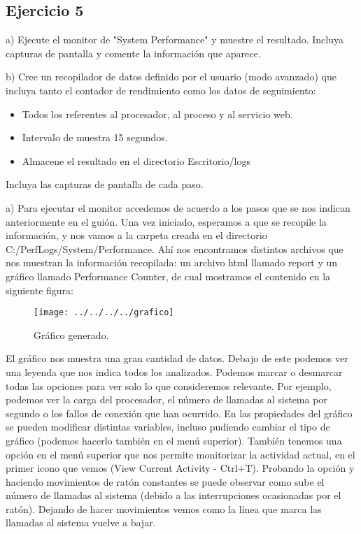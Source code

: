 \documentclass[a4paper, 11pt]{article} %
\begin{document}
\subsection{Ejercicio 5}
a) Ejecute el monitor de "System Performance" y muestre el resultado. Incluya capturas de pantalla y comente la información que aparece. 

b) Cree un recopilador de datos definido por el usuario (modo avanzado) que incluya tanto el contador de rendimiento como los datos de seguimiento: 
\begin{itemize}
\item Todos los referentes al procesador, al proceso y al servicio web. 
\item Intervalo de muestra 15 segundos.
\item Almacene el resultado en el directorio Escritorio/logs
\end{itemize}
Incluya las capturas de pantalla de cada paso. 

a) Para ejecutar el monitor accedemos de acuerdo a los pasos que se nos indican anteriormente en el guión. Una vez iniciado, esperamos a que se recopile la información, y nos vamos a la carpeta creada en el directorio C:/PerfLogs/System/Performance. Ahí nos encontramos distintos archivos que nos muestran la información recopilada: un archivo html llamado report y un gráfico llamado Performance Counter, de cual mostramos el contenido en la siguiente figura: 
\pagebreak
\begin{figure}[htpb]
\centering
\texttt{[image: ../../../../grafico]}
\caption{Gráfico generado.}
\end{figure}

El gráfico nos muestra una gran cantidad de datos. Debajo de este podemos ver una leyenda que nos indica todos los analizados. Podemos marcar o desmarcar todas las opciones para ver solo lo que consideremos relevante. Por ejemplo, podemos ver la carga del procesador, el número de llamadas al sistema por segundo o los fallos de conexión que han ocurrido. En las propiedades del gráfico se pueden modificar distintas variables, incluso pudiendo cambiar el tipo de gráfico (podemos hacerlo también en el menú superior). También tenemos una opción en el menú superior que nos permite monitorizar la actividad actual, en el primer icono que vemos (View Current Activity - Ctrl+T). Probando la opción y haciendo movimientos de ratón constantes se puede observar como sube el número de llamadas al sistema (debido a las interrupciones ocasionadas por el ratón). Dejando de hacer movimientos vemos como la línea que marca las llamadas al sistema vuelve a bajar. 
\end{document}

